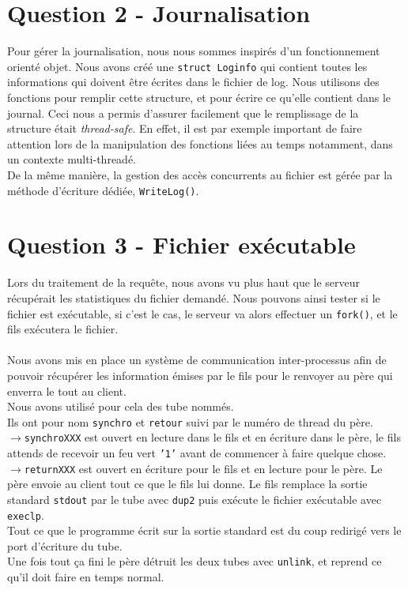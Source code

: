 \documentclass[final,12pt]{article}
\begin{document}
\section*{\textbf{Question 2} - Journalisation {\color{green}\checkmark}}
	Pour gérer la journalisation, nous nous sommes inspirés d'un fonctionnement orienté objet.
	Nous avons créé une \texttt{struct Loginfo} qui contient toutes les informations qui doivent être écrites dans le fichier de log. Nous utilisons des fonctions pour remplir cette structure, et pour écrire ce qu'elle contient dans le journal. Ceci nous a permis d'assurer facilement que le remplissage de la structure était \textit{thread-safe}. En effet, il est par exemple important de faire attention lors de la manipulation des fonctions liées au temps notamment, dans un contexte multi-threadé.\\
	De la même manière, la gestion des accès concurrents au fichier est gérée par la méthode d'écriture dédiée, \texttt{WriteLog()}.

\section*{\textbf{Question 3} - Fichier exécutable {\color{green}\checkmark}}
Lors du traitement de la requête, nous avons vu plus haut que
le serveur récupérait les statistiques du fichier
demandé. Nous pouvons ainsi tester si le fichier est
exécutable, si c'est le cas, le serveur va alors effectuer un
\texttt{fork()}, et le fils exécutera le fichier.\\\\
Nous avons mis en place un système de communication inter-processus
afin de pouvoir récupérer les information émises par le fils pour le
renvoyer au père qui enverra le tout au client.\\
Nous avons utilisé pour cela des tube nommés.\\
Ils ont pour nom \texttt{synchro} et \texttt{retour} suivi par le
numéro de thread du père.\\   
$\rightarrow$\texttt{synchroXXX} est ouvert en lecture dans le fils et en écriture
dans le p\`ere, le fils attends de recevoir un feu vert \texttt{'1'}
avant de commencer à faire quelque chose.\\
$\rightarrow$\texttt{returnXXX} est ouvert en écriture pour le fils et en lecture pour
le père. Le père envoie au client tout ce que le fils lui
donne. Le fils remplace la sortie standard \texttt{stdout} par le tube
avec \texttt{dup2} puis exécute le fichier exécutable avec \texttt{execlp}.\\
Tout ce que le programme écrit sur la sortie standard est du coup
redirigé vers le port d'écriture du tube.\\
Une fois tout ça fini le père détruit les deux tubes avec \texttt{unlink},
et reprend ce qu'il doit faire en temps normal.\\\\
\end{document}
